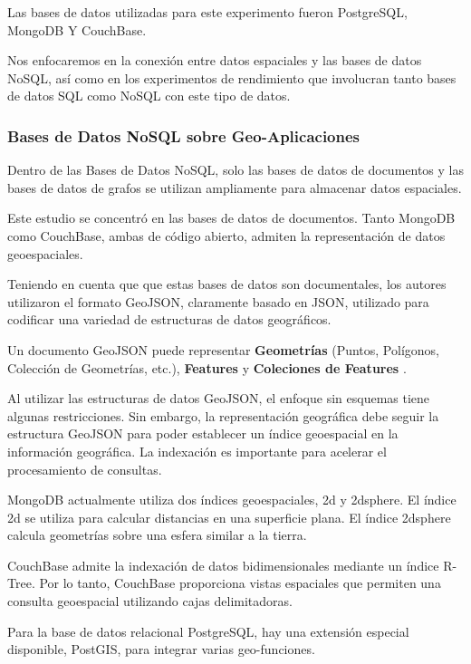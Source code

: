\documentclass[pdflatex,sn-mathphys-num]{sn-jnl}
\theoremstyle{thmstyleone}%
\theoremstyle{thmstyletwo}%
\theoremstyle{thmstylethree}%
\begin{document}
Las bases de datos utilizadas para este experimento fueron PostgreSQL, MongoDB Y CouchBase.

Nos enfocaremos en la conexión entre datos espaciales y las bases de datos NoSQL, así como en los experimentos de rendimiento que involucran tanto bases de datos SQL como NoSQL con este tipo de datos.

\subsubsection{Bases de Datos NoSQL sobre Geo-Aplicaciones}\label{sec521}

Dentro de las Bases de Datos NoSQL, solo las bases de datos de documentos y las bases de datos de grafos se utilizan ampliamente para almacenar datos espaciales.

Este estudio se concentró en las bases de datos de documentos. Tanto MongoDB como CouchBase, ambas de código abierto, admiten la representación de datos geoespaciales.

Teniendo en cuenta que que estas bases de datos son documentales, los autores utilizaron el formato GeoJSON, claramente basado en JSON, utilizado para codificar una variedad de estructuras de datos geográficos.

Un documento GeoJSON puede representar \textbf{Geometrías} (Puntos, Polígonos, Colección de Geometrías, etc.), \textbf{Features} y \textbf{Coleciones de Features} \cite{geojson}.

Al utilizar las estructuras de datos GeoJSON, el enfoque sin esquemas tiene algunas restricciones. Sin embargo, la representación geográfica debe seguir la estructura GeoJSON para poder establecer un índice geoespacial en la información geográfica. La indexación es importante para acelerar el procesamiento de consultas.

MongoDB actualmente utiliza dos índices geoespaciales, 2d y 2dsphere\cite{mongodb2dsphere}. El índice 2d se utiliza para calcular distancias en una superficie plana. El índice 2dsphere calcula geometrías sobre una esfera similar a la tierra.

CouchBase admite la indexación de datos bidimensionales mediante un índice R-Tree\cite{couchbase}. Por lo tanto, CouchBase proporciona vistas espaciales que permiten una consulta geoespacial utilizando cajas delimitadoras.

Para la base de datos relacional PostgreSQL, hay una extensión especial disponible, PostGIS, para integrar varias geo-funciones\cite{post-gis}. 
\end{document}
